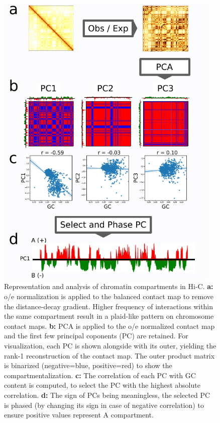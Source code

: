 \begin{figure}[htb]
    \includegraphics[width=0.95\textwidth]{Parts/Part01/gfx/hic_pca_compartments.pdf}
    \caption{Representation and analysis of chromatin compartments in Hi-C. \textbf{a:} \acrfull{o/e} normalization is applied to the balanced contact map to remove the distance-decay gradient. Higher frequency of interactions within the same compartment result in a plaid-like pattern on chromosome contact maps. \textbf{b:} PCA is applied to the \acrshort{o/e} normalized contact map and the first few principal coponents (PC) are retained. For visualization, each PC is shown alongside with its outer, yielding the rank-1 reconstruction of the contact map. The outer product matrix is binarized (negative=blue, positive=red) to show the compartmentalization. \textbf{c:} The correlation of each PC with GC content is computed, to select the PC with the highest absolute correlation. \textbf{d:} The sign of PCs being meaningless, the selected PC is phased (by changing its sign in case of negative correlation) to ensure positive values represent A compartment.}
    \label{fig:01-02:compartments}
\end{figure}

